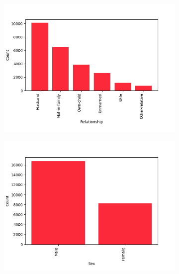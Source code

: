 \documentclass{article}
\begin{document}
\begin{figure}[H]
\begin{subfigure}{0.3\textwidth}
    \end{subfigure}
    \begin{subfigure}{0.3\textwidth}
        \includegraphics[width=\linewidth,]{img/relationship.png}
    \end{subfigure}
    \begin{subfigure}{0.3\textwidth}
        \includegraphics[width=\linewidth,]{img/sex.png}
    \end{subfigure}
    \begin{subfigure}{0.3\textwidth}

\end{subfigure}
\end{figure}
\end{document}
